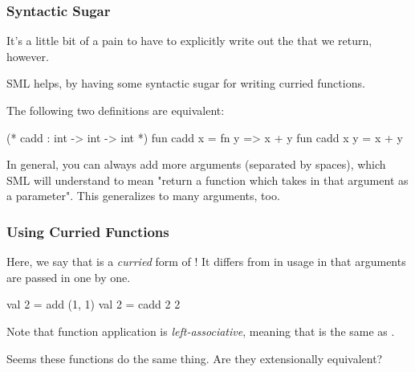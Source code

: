 \documentclass[aspectratio=169, handout]{beamer}
\begin{document}
\begin{frame}[fragile]
  \frametitle{Syntactic Sugar}

  It's a little bit of a pain to have to explicitly write out the  
  that we return, however.

  \pause
  \vspace{\fill}

  SML helps, by having some syntactic sugar for writing curried functions. 

  \pause
  \vspace{\fill}

  The following two definitions are equivalent:
  \begin{codeblock}
    (* cadd : int -> int -> int *)
    fun cadd x = fn y => x + y
    fun cadd x y = x + y
  \end{codeblock}

  \pause
  \vspace{\fill}

  In general, you can always add more arguments (separated by spaces), which SML will
  understand to mean "return a function which takes in that argument as a parameter".
  This generalizes to many arguments, too.
\end{frame}

\begin{frame}[fragile]
  \frametitle{Using Curried Functions}

  Here, we say that  is a \textit{curried} form of !
  It differs from  in usage in that arguments are passed in one by one.

  \pause
  \vspace{\fill}

  \begin{codeblock}
    val 2 = add (1, 1)
    val 2 = cadd 2 2 
  \end{codeblock}

  \pause
  \vspace{\fill}
  
  Note that function application is \textit{left-associative}, meaning that 
   is the same as .

  \pause
  \vspace{\fill}

  Seems these functions do the same thing. Are they extensionally equivalent?
\end{frame}
\end{document}
